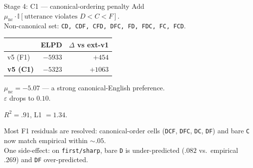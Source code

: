 \documentclass[10pt,aspectratio=169]{beamer}
\newcommand{\main}[1]{\textcolor{CSP-main-dark}{\textbf{#1}}}
\begin{document}
\begin{frame}{Stage 4: C1 --- canonical-ordering penalty}
Add $\mu_\mathrm{nc} \cdot \mathbb{I}[\text{utterance violates } D < C < F]$.\\
\footnotesize Non-canonical set: \texttt{CD, CDF, CFD, DFC, FD, FDC, FC, FCD}.

\vspace{0.4em}
\begin{center}
\begin{tabular}{lrr}
\toprule
& ELPD & $\Delta$ vs ext-v1\\
\midrule
v5 (F1) & $-5933$ & $+454$ \\
\main{v5 (C1)} & \main{$-5323$} & \main{$+1063$} \\
\bottomrule
\end{tabular}
\end{center}

\vspace{0.5em}
$\mu_\mathrm{nc} = -5.07$ --- a strong canonical-English preference.\\
$\varepsilon$ drops to $0.10$.

\vspace{0.4em}
\small $R^2 = .91$, L1 $= 1.34$.

\vspace{0.3em}
\small Most F1 residuals are resolved: canonical-order cells (\texttt{DCF}, \texttt{DFC}, \texttt{DC}, \texttt{DF}) and bare \texttt{C} now match empirical within $\sim .05$.\\
One side-effect: on \texttt{first/sharp}, bare \texttt{D} is under-predicted ($.082$ vs.\ empirical $.269$) and \texttt{DF} over-predicted.
\end{frame}
\end{document}
